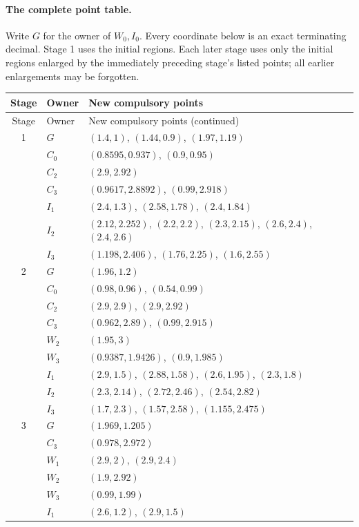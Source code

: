 \documentclass[11pt]{article}
\begin{document}
\paragraph{The complete point table.}
Write $G$ for the owner of $W_0,I_0$. Every coordinate below is an exact
terminating decimal. Stage 1 uses the initial regions. Each later stage
uses only the initial regions enlarged by the immediately preceding
stage's listed points; all earlier enlargements may be forgotten.
\begingroup\small
\begin{longtable}{@{}c l p{}@{}}
\toprule
Stage & Owner & New compulsory points\\\midrule
\endfirsthead
\toprule
Stage & Owner & New compulsory points (continued)\\\midrule
\endhead
1 & $G$ & $(1.4,1)$, $(1.44,0.9)$, $(1.97,1.19)$\\
 & $C_0$ & $(0.8595,0.937)$, $(0.9,0.95)$\\
 & $C_2$ & $(2.9,2.92)$\\
 & $C_3$ & $(0.9617,2.8892)$, $(0.99,2.918)$\\
 & $I_1$ & $(2.4,1.3)$, $(2.58,1.78)$, $(2.4,1.84)$\\
 & $I_2$ & $(2.12,2.252)$, $(2.2,2.2)$, $(2.3,2.15)$, $(2.6,2.4)$, $(2.4,2.6)$\\
 & $I_3$ & $(1.198,2.406)$, $(1.76,2.25)$, $(1.6,2.55)$\\
\midrule
2 & $G$ & $(1.96,1.2)$\\
 & $C_0$ & $(0.98,0.96)$, $(0.54,0.99)$\\
 & $C_2$ & $(2.9,2.9)$, $(2.9,2.92)$\\
 & $C_3$ & $(0.962,2.89)$, $(0.99,2.915)$\\
 & $W_2$ & $(1.95,3)$\\
 & $W_3$ & $(0.9387,1.9426)$, $(0.9,1.985)$\\
 & $I_1$ & $(2.9,1.5)$, $(2.88,1.58)$, $(2.6,1.95)$, $(2.3,1.8)$\\
 & $I_2$ & $(2.3,2.14)$, $(2.72,2.46)$, $(2.54,2.82)$\\
 & $I_3$ & $(1.7,2.3)$, $(1.57,2.58)$, $(1.155,2.475)$\\
\midrule
3 & $G$ & $(1.969,1.205)$\\
 & $C_3$ & $(0.978,2.972)$\\
 & $W_1$ & $(2.9,2)$, $(2.9,2.4)$\\
 & $W_2$ & $(1.9,2.92)$\\
 & $W_3$ & $(0.99,1.99)$\\
 & $I_1$ & $(2.6,1.2)$, $(2.9,1.5)$\\

\end{longtable}
\end{document}
